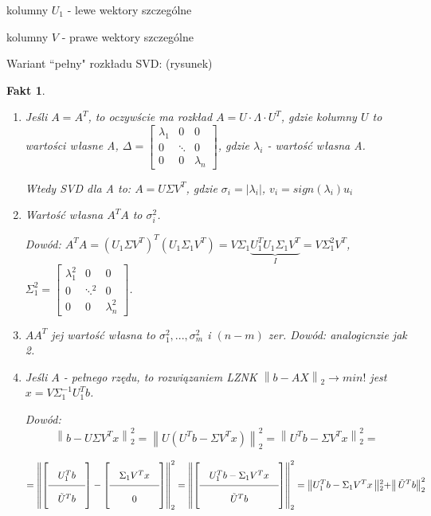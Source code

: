 \documentclass[hidelinks,a4paper]{article}
\newcommand{\ra}{\rightarrow}
\newcommand{\norm}[1]{\left\lVert#1\right\rVert}
\newtheorem{fakt}{Fakt}
\begin{document}
kolumny $U_1$ - lewe wektory szczególne

kolumny $V$ - prawe wektory szczególne

Wariant ``pełny" rozkładu SVD:
(rysunek)

\begin{fakt} $\ $ %
	\begin{enumerate}
		\item Jeśli $A=A^T$, to oczywście ma rozkład $A = U \cdot \Lambda \cdot U^T$, gdzie kolumny $U$ to wartości własne A, $\Delta = \begin{bmatrix}
		      \lambda_1 & 0 & 0\\ 
		      0 & \ddots & 0\\ 
		      0 & 0 & \lambda_n 
		\end{bmatrix}$, gdzie $\lambda_i$ - wartość własna A.
		
		Wtedy SVD dla A to:
		$A = U\Sigma V^T$, gdzie $\sigma_i = |\lambda_i|$, $v_i = sign(\lambda_i)u_i$
		 			
		\item Wartość własna $A^TA$ to $\sigma_i^2$.
		       			
		      Dowód: $A^TA = (U_1\Sigma V^T)^T(U_1 \Sigma_1 V^T) = V \Sigma_1 \underbrace{U_1^T U_1 \Sigma_1 V^T}_{I} = V \Sigma_1^2V^T$, $\Sigma_1^2 = \begin{bmatrix}
		      \lambda_1^2 & 0 & 0\\ 
		      0 & \ddots^2 & 0\\ 
		      0 & 0 & \lambda_n^2 
		\end{bmatrix}$.
				
		\item $AA^T$ jej wartość własna to $\sigma_1^2, ..., \sigma_m^2$ i $(n-m)$ zer.
		      Dowód: analogicnzie jak 2.
		      		
		\item Jeśli $A$ - pełnego rzędu, to rozwiązaniem LZNK $\norm{b - AX}_2 \ra min!$ jest $x = V\Sigma_1^{-1} U_1^Tb$.
		      		
		      Dowód:
		      \[
		      	\norm{b - U\Sigma V^Tx} _2 ^2 = \norm{U(U^Tb - \Sigma V^Tx)}_2^2 = \norm{U^Tb - \Sigma V^Tx}_2^2 =
		      	\]
		      	
		      	\[\arraycolsep=1em\def\arraystretch{2} = \norm{\left[\begin{array}{c}
		      	U_1^Tb\\ 
		      	\hline
		      	\tilde{U}^Tb
		      	\end{array}\right] - \left[\begin{array}{c}\Sigma_1V^Tx\\ \hline 0 \end{array}\right]}_2^2 = \norm{\left[\begin{array}{c}U_1^Tb - \Sigma_1V^Tx\\ \hline \tilde{U}^Tb \end{array}\right]}_2^2 =\norm{U_1^Tb - \Sigma_1V^Tx\norm{_2^2 +} \tilde{U}^Tb}_2^2
		      \]
		      

\end{enumerate}
\end{fakt}
\end{document}
